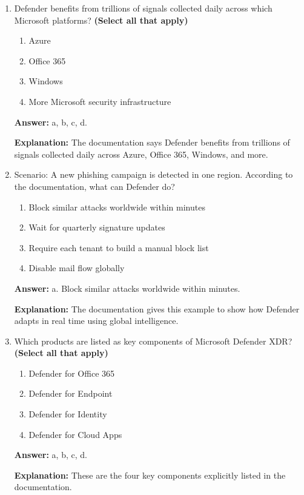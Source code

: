\documentclass[10pt]{article}
\begin{document}
\begin{enumerate}[leftmargin=*]
\textbf{Explanation:} The documentation says post-breach capabilities are critical because attackers often use multi-stage campaigns.

\item Defender benefits from trillions of signals collected daily across which Microsoft platforms? \textbf{(Select all that apply)}
\begin{enumerate}[label=\alph*., leftmargin=1.5em]
\item Azure
\item Office 365
\item Windows
\item More Microsoft security infrastructure
\end{enumerate}
\textbf{Answer:} a, b, c, d.

\textbf{Explanation:} The documentation says Defender benefits from trillions of signals collected daily across Azure, Office 365, Windows, and more.

\item Scenario: A new phishing campaign is detected in one region. According to the documentation, what can Defender do?
\begin{enumerate}[label=\alph*., leftmargin=1.5em]
\item Block similar attacks worldwide within minutes
\item Wait for quarterly signature updates
\item Require each tenant to build a manual block list
\item Disable mail flow globally
\end{enumerate}
\textbf{Answer:} a. Block similar attacks worldwide within minutes.

\textbf{Explanation:} The documentation gives this example to show how Defender adapts in real time using global intelligence.

\item Which products are listed as key components of Microsoft Defender XDR? \textbf{(Select all that apply)}
\begin{enumerate}[label=\alph*., leftmargin=1.5em]
\item Defender for Office 365
\item Defender for Endpoint
\item Defender for Identity
\item Defender for Cloud Apps
\end{enumerate}
\textbf{Answer:} a, b, c, d.

\textbf{Explanation:} These are the four key components explicitly listed in the documentation.


\end{enumerate}
\end{document}
